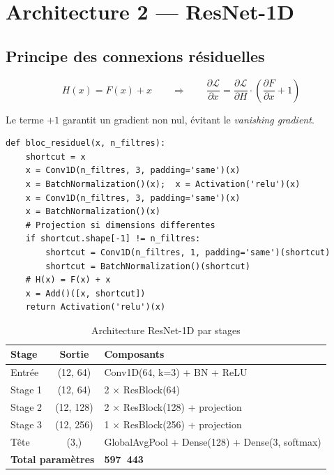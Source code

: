 \documentclass[12pt,a4paper]{report}
\begin{document}
\section{Architecture 2 --- ResNet-1D}

\subsection{Principe des connexions r\'{e}siduelles}

\begin{equation}
H(x) = F(x) + x \qquad \Rightarrow \qquad
\frac{\partial \mathcal{L}}{\partial x} = \frac{\partial \mathcal{L}}{\partial H} \cdot \left(\frac{\partial F}{\partial x} + 1\right)
\end{equation}

Le terme $+1$ garantit un gradient non nul, \'{e}vitant le \textit{vanishing gradient}.

\begin{lstlisting}[style=python, caption={Bloc r\'{e}siduel ResNet-1D}]
def bloc_residuel(x, n_filtres):
    shortcut = x
    x = Conv1D(n_filtres, 3, padding='same')(x)
    x = BatchNormalization()(x);  x = Activation('relu')(x)
    x = Conv1D(n_filtres, 3, padding='same')(x)
    x = BatchNormalization()(x)
    # Projection si dimensions differentes
    if shortcut.shape[-1] != n_filtres:
        shortcut = Conv1D(n_filtres, 1, padding='same')(shortcut)
        shortcut = BatchNormalization()(shortcut)
    # H(x) = F(x) + x
    x = Add()([x, shortcut])
    return Activation('relu')(x)
\end{lstlisting}

\begin{table}[H]
\centering
\begin{tabular}{|l|c|l|}
\hline
\rowcolor{bleu!15}
\textbf{Stage} & \textbf{Sortie} & \textbf{Composants} \\
\hline
Entr\'{e}e & (12, 64) & Conv1D(64, k=3) + BN + ReLU \\
\hline
Stage 1 & (12, 64) & 2 $\times$ ResBlock(64) \\
\hline
Stage 2 & (12, 128) & 2 $\times$ ResBlock(128) + projection \\
\hline
Stage 3 & (12, 256) & 1 $\times$ ResBlock(256) + projection \\
\hline
T\^{e}te & (3,) & GlobalAvgPool + Dense(128) + Dense(3, softmax) \\
\hline
\multicolumn{2}{|c|}{\textbf{Total param\`{e}tres}} & \textbf{597~443} \\
\hline
\end{tabular}
\caption{Architecture ResNet-1D par stages}
\label{tab:resnet_arch}
\end{table}
\end{document}
